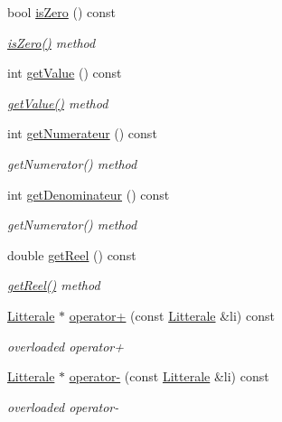 \begin{DoxyCompactItemize}
bool \hyperlink{class_li_rationnelle_a3c9713b43958f09c4e2a7506fd9fdee8}{is\+Zero} () const 
\begin{DoxyCompactList}\small\item\em \hyperlink{class_li_rationnelle_a3c9713b43958f09c4e2a7506fd9fdee8}{is\+Zero()} method \end{DoxyCompactList}\item 
int \hyperlink{class_li_rationnelle_aa84a9691ac8a8673b8397ce3fe1efcc0}{get\+Value} () const 
\begin{DoxyCompactList}\small\item\em \hyperlink{class_li_rationnelle_aa84a9691ac8a8673b8397ce3fe1efcc0}{get\+Value()} method \end{DoxyCompactList}\item 
int \hyperlink{class_li_rationnelle_aeec109595a83168a8050b3f9608ac63e}{get\+Numerateur} () const 
\begin{DoxyCompactList}\small\item\em get\+Numerator() method \end{DoxyCompactList}\item 
int \hyperlink{class_li_rationnelle_aef5786f2be1ad1c301352d75c7eb14ed}{get\+Denominateur} () const 
\begin{DoxyCompactList}\small\item\em get\+Numerator() method \end{DoxyCompactList}\item 
double \hyperlink{class_li_rationnelle_a546fd77067d7ba3593b8bf9b05d7db5c}{get\+Reel} () const 
\begin{DoxyCompactList}\small\item\em \hyperlink{class_li_rationnelle_a546fd77067d7ba3593b8bf9b05d7db5c}{get\+Reel()} method \end{DoxyCompactList}\item 
\hyperlink{class_litterale}{Litterale} $\ast$ \hyperlink{class_li_rationnelle_a6c33888d3b84585c4ca636f592d05b2f}{operator+} (const \hyperlink{class_litterale}{Litterale} \&li) const 
\begin{DoxyCompactList}\small\item\em overloaded operator+ \end{DoxyCompactList}\item 
\hyperlink{class_litterale}{Litterale} $\ast$ \hyperlink{class_li_rationnelle_a8988443214ef0712ea1f48599cfd1168}{operator-\/} (const \hyperlink{class_litterale}{Litterale} \&li) const 
\begin{DoxyCompactList}\small\item\em overloaded operator-\/ \end{DoxyCompactList}\item 

\end{DoxyCompactItemize}
